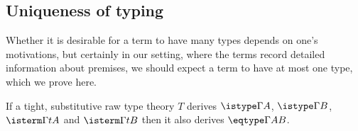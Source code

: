 


\subsection{Uniqueness of typing}

Whether it is desirable for a term to have many types depends on one's motivations, but certainly in our setting, where the terms record detailed information about premises, we should expect a term to have at most one type, which we prove here.

\begin{theorem}
  \label{thm:tight-uniqueness-of-typing}
  If a tight, substitutive raw type theory $T$ derives $\istype \Gamma A$, $\istype \Gamma B$, $\isterm \Gamma t A$ and $\isterm \Gamma t B$ then it also derives $\eqtype \Gamma A B$.
\end{theorem}


